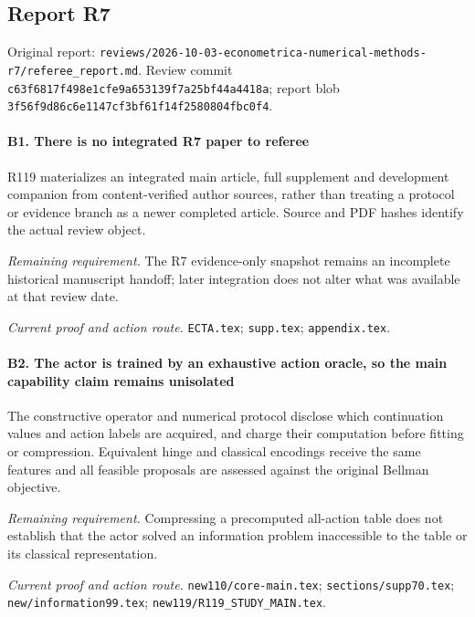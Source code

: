 \subsection{Report R7}

Original report: \nolinkurl{reviews/2026-10-03-econometrica-numerical-methods-r7/referee_report.md}. Review commit \nolinkurl{c63f6817f498e1cfe9a653139f7a25bf44a4418a}; report blob \nolinkurl{3f56f9d86c6e1147cf3bf61f14f2580804fbc0f4}.

\paragraph{B1. There is no integrated R7 paper to referee}

R119 materializes an integrated main article, full supplement and development companion from content-verified author sources, rather than treating a protocol or evidence branch as a newer completed article. Source and PDF hashes identify the actual review object.

\par\emph{Remaining requirement.} The R7 evidence-only snapshot remains an incomplete historical manuscript handoff; later integration does not alter what was available at that review date.

\par\emph{Current proof and action route.} \nolinkurl{ECTA.tex}; \nolinkurl{supp.tex}; \nolinkurl{appendix.tex}.

\paragraph{B2. The actor is trained by an exhaustive action oracle, so the main capability claim remains unisolated}

The constructive operator and numerical protocol disclose which continuation values and action labels are acquired, and charge their computation before fitting or compression. Equivalent hinge and classical encodings receive the same features and all feasible proposals are assessed against the original Bellman objective.

\par\emph{Remaining requirement.} Compressing a precomputed all-action table does not establish that the actor solved an information problem inaccessible to the table or its classical representation.

\par\emph{Current proof and action route.} \nolinkurl{new110/core-main.tex}; \nolinkurl{sections/supp70.tex}; \nolinkurl{new/information99.tex}; \nolinkurl{new119/R119_STUDY_MAIN.tex}.

